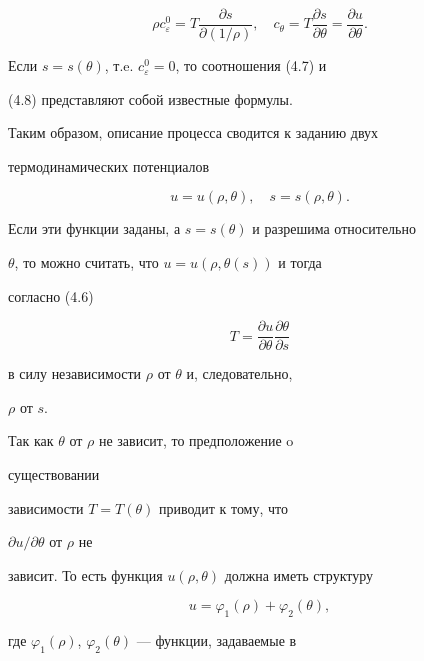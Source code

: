 \begin{equation}


\rho  c^0_\varepsilon=T\frac{\partial s}{\partial(1/\rho )},\quad


c_\theta=T\frac{\partial s}{\partial\theta}=


\frac{\partial u}{\partial\theta}.\tag{4.8}


\end{equation}


Если $s=s(\theta)$, т.e. $c^0_\varepsilon=0$, то соотношения (4.7) и


(4.8) представляют собой известные \cite{Sed} формулы.





Таким образом, описание процесса сводится к заданию двух


термодинамических потенциалов


$$


u=u(\rho ,\theta),\quad s=s(\rho ,\theta).


$$


Если эти функции заданы, а $s=s(\theta)$ и разрешима относительно


$\theta$, то можно считать, что $u=u(\rho ,\theta(s))$ и тогда


согласно (4.6)


$$


T=\frac{\partial u}{\partial\theta}


\frac{\partial\theta}{\partial s}


$$


в силу независимости $\rho $ от $\theta$ и, следовательно,


$\rho $ от $s$.





Так как $\theta$ от $\rho $ не зависит, то предположение o


существовании


зависимости $T=T(\theta)$ приводит к тому, что


$\partial u/\partial\theta$ от $\rho $ не


зависит. То есть функция $u(\rho ,\theta)$ должна иметь структуру


\cite{Gri}


$$


u=\varphi_1(\rho )+\varphi_2(\theta),


$$


где $\varphi_1(\rho )$, $\varphi_2(\theta)$ --- функции, задаваемые в


